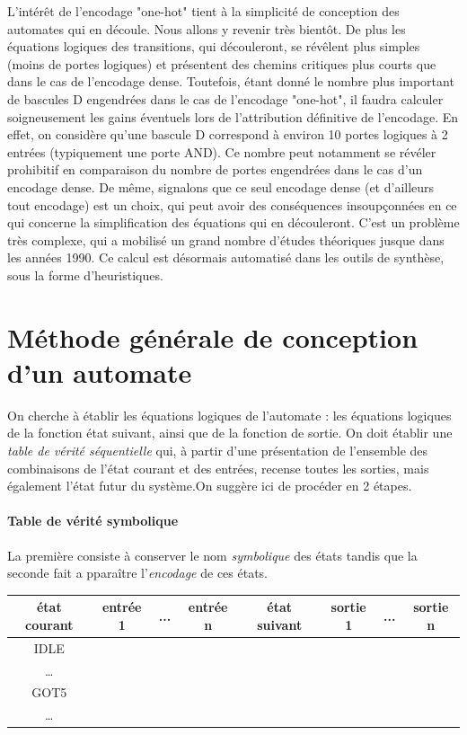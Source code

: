 L'intérêt de l'encodage "one-hot" tient à la simplicité de conception des automates qui en découle.
Nous allons y revenir très bientôt. De plus les équations logiques des transitions, qui découleront, se révêlent plus simples (moins de portes logiques) et présentent
des chemins critiques plus courts que dans le cas de l'encodage dense.
Toutefois, étant donné le nombre plus important de bascules D engendrées dans le cas de l'encodage "one-hot",
il faudra calculer soigneusement les gains éventuels lors de l'attribution définitive de l'encodage.
En effet, on considère qu'une bascule D correspond à environ 10 portes logiques à 2 entrées (typiquement une porte AND). Ce nombre
peut notamment se révéler prohibitif en comparaison du nombre de portes engendrées dans le cas d'un encodage dense.
De même, signalons que ce seul encodage dense (et d'ailleurs tout encodage) est un choix, qui peut avoir des conséquences
insoupçonnées en ce qui concerne la simplification des équations qui en découleront. C'est un problème très complexe, qui a mobilisé
un grand nombre d'études théoriques jusque dans les années 1990.
Ce calcul est désormais automatisé dans les outils de synthèse, sous la forme d'heuristiques.

\section{Méthode générale de conception d'un automate}
On cherche à établir les équations logiques de l'automate : les équations logiques de la fonction état suivant,
ainsi que de la fonction de sortie. On doit établir une {\it table de vérité séquentielle} qui, à partir d'une présentation de l'ensemble des combinaisons de l'état courant et des entrées,
recense toutes les sorties, mais également l'état futur du système.On suggère ici de procéder en 2 étapes.

\paragraph{Table de vérité symbolique}
  La première consiste à conserver le nom {\it symbolique} des états tandis que la seconde fait a
pparaître l'{\it encodage} de ces états.

\begin{table}[!htb]
  \centering
  \begin{tabular}{|c|c|c|c||c|c|c|c|}
        \hline
        état courant & entrée 1 & ... & entrée n &  état suivant & sortie 1 & ... & sortie n \\ \hline
        IDLE        & ~    & ~     & ~            & ~            & ~        & ~   & ~    \\ \hline
        \dots       & ~    & ~     & ~            & ~            & ~        & ~   & ~    \\ \hline
        GOT5        & ~    & ~     & ~            & ~            & ~        & ~   & ~    \\ \hline
        \dots       & ~    & ~     & ~            & ~            & ~        & ~   & ~    \\ \hline
    \end{tabular}
\end{table}

